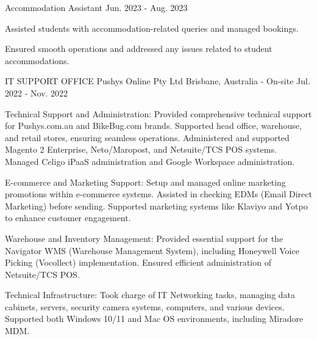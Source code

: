 \begin{cventries}
  \cventry
    {Accommodation Assistant} %
    {} %
    {} %
    {Jun. 2023 - Aug. 2023} %
    {
      \begin{cvitems} %
        \item {Assisted students with accommodation-related queries and managed bookings.}
        \item {Ensured smooth operations and addressed any issues related to student accommodations.}
      \end{cvitems}
    }
  \cventry
    {IT SUPPORT OFFICE} %
    {Pushys Online Pty Ltd} %
    {Brisbane, Australia - On-site} %
    {Jul. 2022 - Nov. 2022} %
    {
      \begin{cvitems} 
        \item {Technical Support and Administration: Provided comprehensive technical support for Pushys.com.au and BikeBug.com brands. Supported head office, warehouse, and retail stores, ensuring seamless operations. Administered and supported Magento 2 Enterprise, Neto/Maropost, and Netsuite/TCS POS systems. Managed Celigo iPaaS administration and Google Workspace administration.}
        \item {E-commerce and Marketing Support: Setup and managed online marketing promotions within e-commerce systems. Assisted in checking EDMs (Email Direct Marketing) before sending. Supported marketing systems like Klaviyo and Yotpo to enhance customer engagement.}
        \item {Warehouse and Inventory Management: Provided essential support for the Navigator WMS (Warehouse Management System), including Honeywell Voice Picking (Vocollect) implementation. Ensured efficient administration of Netsuite/TCS POS.}
        \item {Technical Infrastructure: Took charge of IT Networking tasks, managing data cabinets, servers, security camera systems, computers, and various devices. Supported both Windows 10/11 and Mac OS environments, including Miradore MDM.}
      \end{cvitems}
    }

  


\end{cventries}
